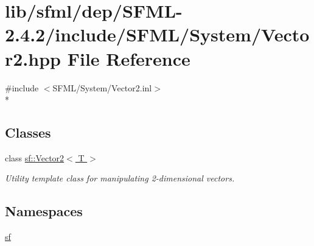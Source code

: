 \hypertarget{lib_2sfml_2dep_2_s_f_m_l-2_84_82_2include_2_s_f_m_l_2_system_2_vector2_8hpp}{\section{lib/sfml/dep/\-S\-F\-M\-L-\/2.4.2/include/\-S\-F\-M\-L/\-System/\-Vector2.hpp File Reference}
\label{lib_2sfml_2dep_2_s_f_m_l-2_84_82_2include_2_s_f_m_l_2_system_2_vector2_8hpp}
}
{\ttfamily \#include $<$S\-F\-M\-L/\-System/\-Vector2.\-inl$>$}\\*
\subsection*{Classes}
\begin{DoxyCompactItemize}
\item 
class \hyperlink{classsf_1_1_vector2}{sf\-::\-Vector2$<$ T $>$}
\begin{DoxyCompactList}\small\item\em Utility template class for manipulating 2-\/dimensional vectors. \end{DoxyCompactList}\end{DoxyCompactItemize}
\subsection*{Namespaces}
\begin{DoxyCompactItemize}
\item 
\hyperlink{namespacesf}{sf}
\end{DoxyCompactItemize}
